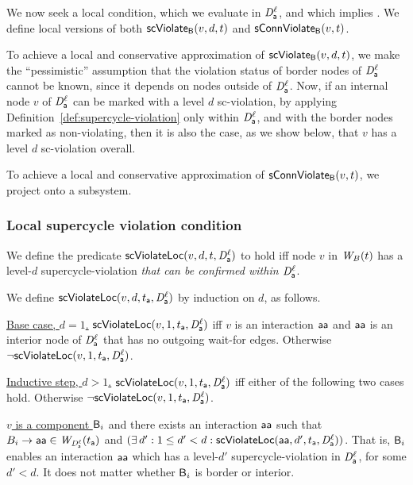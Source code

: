 
We now seek a local condition, which we evaluate in $\mathit{D}_{\mathsf{a}}^{\ell}$, and which implies \GAO.
We define local versions of both $\mathsf{scViolate}_{\mathsf{B}}(v,d,t)$ and $\mathsf{sConnViolate}_{\mathsf{B}}(v,t)$.

To achieve a local and conservative approximation of $\mathsf{scViolate}_{\mathsf{B}}(v,d,t)$, we make the ``pessimistic'' assumption that the violation status of border
nodes of $\mathit{D}_{\mathsf{a}}^{\ell}$ cannot be known, since it depends on nodes outside of $\mathit{D}_{\mathsf{a}}^{\ell}$.
Now, if an internal node $v$ of $\mathit{D}_{\mathsf{a}}^{\ell}$ can be marked with a level $d$ sc-violation, by applying 
Definition~\ref{def:supercycle-violation} only within
$\mathit{D}_{\mathsf{a}}^{\ell}$, and with the border nodes marked as non-violating,
then it is also the case, as we show below, that $v$ has a level $d$ sc-violation overall.

To achieve a local and conservative approximation of
$\mathsf{sConnViolate}_{\mathsf{B}}(v,t)$, we project onto a subsystem.




\subsubsection{Local supercycle violation condition}

We define the predicate $\mathsf{scViolateLoc}(v,d,t,\mathit{D}_{\mathsf{a}}^{\ell})$ to hold iff node $v$ in $\mathit{W}_{B}({t})$ has a level-$d$ supercycle-violation
\emph{that can be confirmed within $\mathit{D}_{\mathsf{a}}^{\ell}$}.

\label{def:supercycle.violation.local}
We define $\mathsf{scViolateLoc}(v,d,t_{\mathsf{a}},\mathit{D}_{\mathsf{a}}^{\ell})$ by induction on $d$, as follows.

\noindent
\ul{Base case, $d=1$.} $\mathsf{scViolateLoc}(v,1,t_{\mathsf{a}},\mathit{D}_{\mathsf{a}}^{\ell})$  iff
$v$ is an interaction $\mathsf{aa}$ and 
$\mathsf{aa}$ is an interior node of $\mathit{D}_{\mathsf{a}}^{\ell}$ that has no outgoing wait-for edges.
Otherwise $\neg \mathsf{scViolateLoc}(v,1,t_{\mathsf{a}},\mathit{D}_{\mathsf{a}}^{\ell})$. 

\noindent
\ul{Inductive step, $d > 1$.} $\mathsf{scViolateLoc}(v,1,t_{\mathsf{a}},\mathit{D}_{\mathsf{a}}^{\ell})$ iff either of the following two cases hold. Otherwise $\neg \mathsf{scViolateLoc}(v,1,t_{\mathsf{a}},\mathit{D}_{\mathsf{a}}^{\ell})$.

\bn

\item \ul{$v$ is a component $\mathsf{B}_i$} and there exists an interaction $\mathsf{aa}$ such that $B_i \rightarrow \mathsf{aa} \in \mathit{W}_{\mathit{D}_{\mathsf{a}}^{\ell}}({t_{\mathsf{a}}})$ and 
    $(\exists\, d': 1 \le d' < d : \mathsf{scViolateLoc}(\mathsf{aa},d',t_{\mathsf{a}},\mathit{D}_{\mathsf{a}}^{\ell}))$.
    That is, $\mathsf{B}_i$ enables an interaction $\mathsf{aa}$ which has a level-$d'$ supercycle-violation in $\mathit{D}_{\mathsf{a}}^{\ell}$, for some $d' < d$. 
    It does not matter whether $\mathsf{B}_i$ is border or interior.


